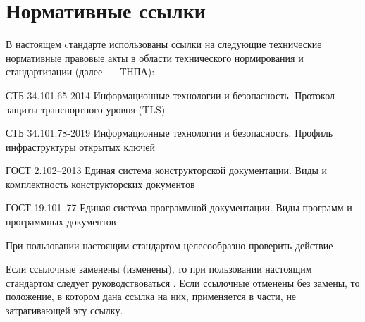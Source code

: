 \chapter{Нормативные ссылки}\label{REFS}

В настоящем cтандарте использованы ссылки на следующие 
технические нормативные правовые акты в области 
технического нормирования и стандартизации (далее~--- ТНПА):

СТБ 34.101.65-2014 Информационные технологии и безопасность. Протокол защиты 
транспортного уровня (TLS)

СТБ 34.101.78-2019 Информационные технологии и безопасность. Профиль 
инфраструктуры открытых ключей

ГОСТ 2.102–2013 Единая система конструкторской документации. Виды и 
комплектность конструкторских документов

ГОСТ 19.101–77 Единая система программной документации. Виды программ и 
программных документов

\begin{note*}
При пользовании настоящим стандартом целесообразно проверить действие

Если ссылочные  заменены (изменены), то при пользовании
настоящим стандартом следует руководствоваться . Если ссылочные  отменены без замены, то
положение, в котором дана ссылка на них, применяется в части, не затрагивающей
эту ссылку.
\end{note*}


